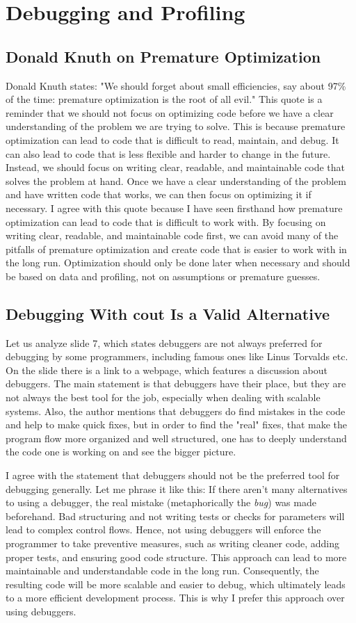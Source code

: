 \documentclass[../../main.tex]{subfiles}
\begin{document}
\section{Debugging and Profiling}
\subsection{Donald Knuth on Premature Optimization}
Donald Knuth states: "We should forget about small efficiencies, say about 97\% of the time: premature optimization is the root of all evil."
This quote is a reminder that we should not focus on optimizing code before we have a clear understanding of the problem we are trying to solve. This is because premature optimization can lead to code that is difficult to read, maintain, and debug. It can also lead to code that is less flexible and harder to change in the future. Instead, we should focus on writing clear, readable, and maintainable code that solves the problem at hand. Once we have a clear understanding of the problem and have written code that works, we can then focus on optimizing it if necessary. I agree with this quote because I have seen firsthand how premature optimization can lead to code that is difficult to work with. By focusing on writing clear, readable, and maintainable code first, we can avoid many of the pitfalls of premature optimization and create code that is easier to work with in the long run. Optimization should only be done later when necessary and should be based on data and profiling, not on assumptions or premature guesses.

\subsection{Debugging With cout Is a Valid Alternative}
Let us analyze slide 7, which states debuggers are not always preferred for debugging by some programmers, including famous ones like Linus Torvalds etc. On the slide there is a link to a webpage, which features a discussion about debuggers. The main statement is that debuggers have their place, but they are not always the best tool for the job, especially when dealing with scalable systems. Also, the author mentions that debuggers do find mistakes in the code and help to make quick fixes, but in order to find the "real" fixes, that make the program flow more organized and well structured, one has to deeply understand the code one is working on and see the bigger picture.

I agree with the statement that debuggers should not be the preferred tool for debugging generally. Let me phrase it like this: If there aren't many alternatives to using a debugger, the real mistake (metaphorically the \emph{bug}) was made beforehand. Bad structuring and not writing tests or checks for parameters will lead to complex control flows. Hence, not using debuggers will enforce the programmer to take preventive measures, such as writing cleaner code, adding proper tests, and ensuring good code structure. This approach can lead to more maintainable and understandable code in the long run. Consequently, the resulting code will be more scalable and easier to debug, which ultimately leads to a more efficient development process. This is why I prefer this approach over using debuggers.
\end{document}
